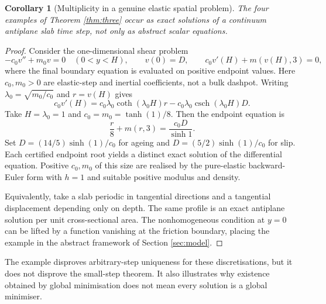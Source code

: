 \documentclass[11pt,a4paper]{article}
\newtheorem{corollary}[theorem]{Corollary}
\theoremstyle{definition}\newtheorem{definition}[theorem]{Definition}
\theoremstyle{remark}\newtheorem{remark}[theorem]{Remark}
\numberwithin{equation}{section}
\begin{document}
\begin{corollary}[Multiplicity in a genuine elastic spatial problem]\label{cor:slab}
The four examples of Theorem \ref{thm:three} occur as exact solutions of a continuum antiplane slab time step, not only as abstract scalar equations.
\end{corollary}
\begin{proof}
Consider the one-dimensional shear problem
\[
 -c_0v''+m_0v=0\quad(0<y<H),\qquad
 v(0)=D,\qquad c_0v'(H)+m(v(H),3)=0,
\]
where the final boundary equation is evaluated on positive endpoint values. Here $c_0,m_0>0$ are elastic-step and inertial coefficients, not a bulk dashpot. Writing $\lambda_0=\sqrt{m_0/c_0}$ and $r=v(H)$ gives
\[
 c_0v'(H)=c_0\lambda_0\coth(\lambda_0H)r
              -c_0\lambda_0\operatorname{csch}(\lambda_0H)D.
\]
Take $H=\lambda_0=1$ and $c_0=m_0=\tanh(1)/8$. Then the endpoint equation is
\[
 \frac r8+m(r,3)=\frac{c_0D}{\sinh1}.
\]
Set $D=(14/5)\sinh(1)/c_0$ for ageing and $D=(5/2)\sinh(1)/c_0$ for slip. Each certified endpoint root yields a distinct exact solution of the differential equation. Positive $c_0,m_0$ of this size are realised by the pure-elastic backward-Euler form with $h=1$ and suitable positive modulus and density.

Equivalently, take a slab periodic in tangential directions and a tangential displacement depending only on depth. The same profile is an exact antiplane solution per unit cross-sectional area. The nonhomogeneous condition at $y=0$ can be lifted by a function vanishing at the friction boundary, placing the example in the abstract framework of Section \ref{sec:model}.
\end{proof}
The example disproves arbitrary-step uniqueness for these discretisations, but it does not disprove the small-step theorem. It also illustrates why existence obtained by global minimisation does not mean every solution is a global minimiser.
\end{document}
